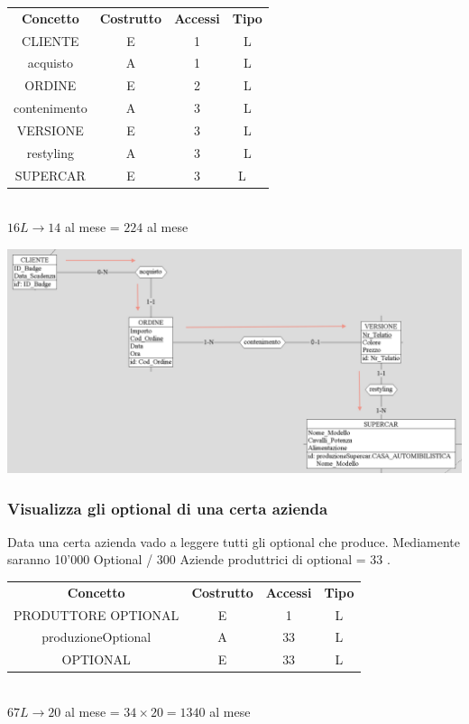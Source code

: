 \documentclass[11pt]{article}
\begin{document}
\begin{table}[H]
    \centering
    \begin{tabular}{ c c c c }
        \rowcolor{red!20!}
        \textbf{Concetto} & \textbf{Costrutto}  & \textbf{Accessi} &
        \textbf{Tipo}\\ 
        CLIENTE & E & 1 & L \\
        acquisto & A & 1 & L \\ 
        ORDINE & E & 2 & L \\ 
        contenimento & A & 3 & L \\
        VERSIONE & E & 3 & L \\ 
        restyling & A & 3 & L \\
        SUPERCAR & E & 3 & L \ \end{tabular}\\
        \( 16L  \rightarrow 14 \) al mese = \( 224 \) al mese
\end{table}

\begin{center}
    \includegraphics[scale=0.53]{images/navigationSchemes/ordiniCliente.png}
\end{center}

\subsubsection{Visualizza gli optional di una certa azienda} 

Data una certa azienda vado a leggere tutti gli optional che produce. Mediamente
saranno 10'000 Optional / 300 Aziende produttrici di optional = 33 .

\begin{table}[H]
    \centering
    \begin{tabular}{ c c c c } 
        \rowcolor{red!20!}
        \textbf{Concetto} & \textbf{Costrutto} & \textbf{Accessi} &
        \textbf{Tipo}\\ 
        PRODUTTORE OPTIONAL & E & 1 & L \\ 
        produzioneOptional & A & 33 & L \\
        OPTIONAL & E & 33 & L \\ 
    \end{tabular}\\
    \( 67L \rightarrow 20\) al mese = \( 34 \times 20 = 1340 \) al mese
\end{table}
\end{document}
